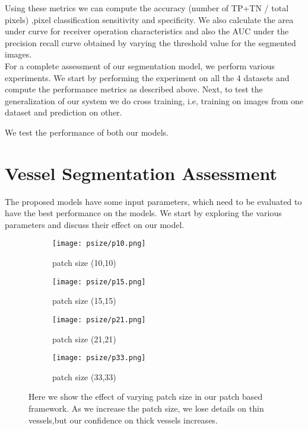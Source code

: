 Using these metrics we can compute the accuracy (number of TP+TN / total pixels) ,pixel classification sensitivity and specificity. We also calculate the area under curve for receiver operation characteristics and also the AUC under the precision recall curve obtained by varying the threshold value for the segmented images.\\

For a complete assessment of our segmentation model, we perform various experiments. We start by performing the experiment on all the 4 datasets and compute the performance metrics as described above. Next, to test the generalization of our system we do cross training, i.e, training on images from one dataset and prediction on other.

We test the performance of both our models.  	

\section{Vessel Segmentation Assessment}
The proposed models have some input parameters, which need to be evaluated to have the best performance on the models. We start by exploring the various parameters and discuss their effect on our model.\\
\begin{figure}
	\begin{subfigure}[b]{0.45\textwidth}
		\texttt{[image: psize/p10.png]}
		\caption{patch size (10,10)}
		\label{fig:p10}
	\end{subfigure}
	\begin{subfigure}[b]{0.45\textwidth}
		\texttt{[image: psize/p15.png]}
		\caption{patch size (15,15)}
		\label{fig:p15}
	\end{subfigure}
	
	\begin{subfigure}[b]{0.45\textwidth}
		\texttt{[image: psize/p21.png]}
		\caption{patch size (21,21)}
		\label{fig:p21}
	\end{subfigure}
	\begin{subfigure}[b]{0.45\textwidth}
		\texttt{[image: psize/p33.png]}
		\caption{patch size (33,33)}
		\label{fig:33}
	\end{subfigure}
	\caption[Image segmentation using varying patch sizes]{Here we show the effect of varying patch size in our patch based framework. As we increase the patch size, we lose details on thin vessels,but our confidence on thick vessels increases.}
	\label{fig:patch size}
\end{figure}

